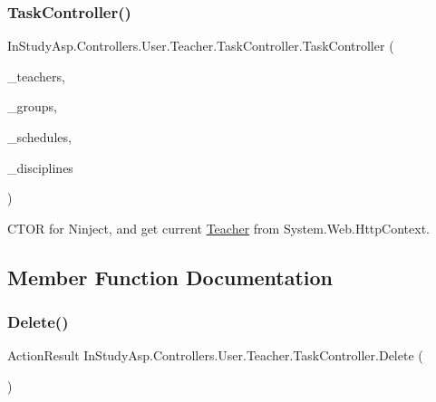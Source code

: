 \subsubsection{\texorpdfstring{Task\+Controller()}{TaskController()}}
{\footnotesize\ttfamily In\+Study\+Asp.\+Controllers.\+User.\+Teacher.\+Task\+Controller.\+Task\+Controller (\begin{DoxyParamCaption}\item[{\hyperlink{interface_repo_1_1_common_1_1_i_generic_repository}{I\+Generic\+Repository}$<$ \hyperlink{class_e_f_oracle_1_1_model_1_1_t_e_a_c_h_e_r}{T\+E\+A\+C\+H\+ER} $>$}]{\+\_\+teachers,  }\item[{\hyperlink{interface_repo_1_1_common_1_1_i_generic_repository}{I\+Generic\+Repository}$<$ \hyperlink{class_e_f_oracle_1_1_model_1_1_g_r_o_u_p}{G\+R\+O\+UP} $>$}]{\+\_\+groups,  }\item[{\hyperlink{class_repo_1_1_schedule_repository}{Schedule\+Repository}}]{\+\_\+schedules,  }\item[{\hyperlink{interface_repo_1_1_common_1_1_i_generic_repository}{I\+Generic\+Repository}$<$ \hyperlink{class_e_f_oracle_1_1_model_1_1_d_i_s_c_i_p_l_i_n_e}{D\+I\+S\+C\+I\+P\+L\+I\+NE} $>$}]{\+\_\+disciplines }\end{DoxyParamCaption})}



C\+T\+OR for Ninject, and get current \hyperlink{namespace_in_study_asp_1_1_controllers_1_1_user_1_1_teacher}{Teacher} from System.\+Web.\+Http\+Context. 



\subsection{Member Function Documentation}
\mbox{\label{class_in_study_asp_1_1_controllers_1_1_user_1_1_teacher_1_1_task_controller_af96d0db6c6f1f3b3942b4fff837d63b2}} 
\subsubsection{\texorpdfstring{Delete()}{Delete()}}
{\footnotesize\ttfamily Action\+Result In\+Study\+Asp.\+Controllers.\+User.\+Teacher.\+Task\+Controller.\+Delete (\begin{DoxyParamCaption}{ }\end{DoxyParamCaption})}




